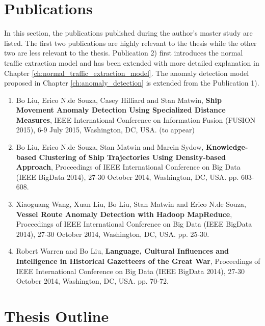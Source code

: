 \documentclass[12pt,glossary]{dalcsthesis}
\begin{document}
\section{Publications}

In this section, the publications published during the author's master study are listed. The first two publications are highly relevant to the thesis while the other two are less relevant to the thesis. Publication 2) first introduces the normal traffic extraction model and has been extended with more detailed explanation in Chapter \ref{ch:normal_traffic_extraction_model}. The anomaly detection model proposed in Chapter \ref{ch:anomaly_detection} is extended from the Publication 1).

\begin{enumerate}[
labelindent=*,
style=multiline,
leftmargin=*,
label= \arabic*)
]

\item Bo Liu, Erico N.de Souza, Casey Hilliard and Stan Matwin, \textbf{Ship Movement Anomaly Detection Using Specialized Distance Measures}, IEEE International Conference on Information Fusion (FUSION 2015), 6-9 July 2015, Washington, DC, USA. (to appear)


\item  Bo Liu, Erico N.de Souza, Stan Matwin and Marcin Sydow, \textbf{Knowledge-based Clustering of Ship Trajectories Using Density-based Approach}, Proceedings of IEEE International Conference on Big Data (IEEE BigData 2014), 27-30 October 2014, Washington, DC, USA. pp. 603-608.

\item  Xiaoguang Wang, Xuan Liu, Bo Liu, Stan Matwin and Erico N.de Souza, \textbf{Vessel Route Anomaly Detection with Hadoop MapReduce}, Proceedings of IEEE International Conference on Big Data (IEEE BigData 2014), 27-30 October 2014, Washington, DC, USA. pp. 25-30.

\item  Robert Warren and Bo Liu, \textbf{Language, Cultural Influences and Intelligence in Historical Gazetteers of the Great War}, Proceedings of IEEE International Conference on Big Data (IEEE BigData 2014), 27-30 October 2014, Washington, DC, USA.  pp. 70-72.


\end{enumerate}




\section{Thesis Outline}
\end{document}
